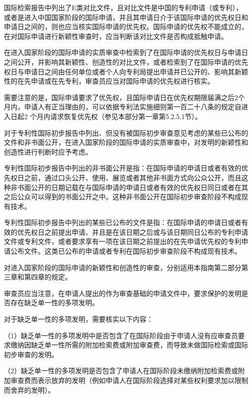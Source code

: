 国际检索报告中列出了E类对比文件，且对比文件是中国的专利申请（或专利），或者是进入中国国家阶段的国际申请，并且其申请日介于该国际申请的优先权日和申请日之间的，则也应当核实国际申请的优先权。国际申请的优先权不能成立的，在对国际申请进行新颖性审查时，应当判断该对比文件是否构成抵触申请。

在进入国家阶段的国际申请的实质审查中检索到了在国际申请的优先权日与申请日之间公开，并影响其新颖性、创造性的对比文件，或者检索到了在国际申请的优先权日与申请日之间由任何单位或者个人向专利局提出申请并已公开的、影响其新颖性的在先申请或在先专利，审查员应当对国际申请的优先权进行核实。

需要注意的是，国际申请要求了优先权，且国际申请日在优先权期限届满之后2个月内，申请人有正当理由的，可以依据专利法实施细则第一百二十八条的规定自进入日起2 个月内请求恢复优先权（参见本部分第一章第5.2.5.1节）。

对于专利性国际初步报告中列出、但没有被国际初步审查意见考虑的某些已公布的文件和非书面公开，在进入国家阶段的国际申请的实质审查中，对发明的新颖性和创造性进行判断时应予考虑。

专利性国际初步报告中列出的非书面公开是指：在国际申请的申请日或者有效的优先权日之前，通过口头公开、使用、展览或者其他非书面方式向公众公开，而且这种非书面公开的日期记载在与国际申请的申请日或者有效的优先权日同日或者在其之后公众可以得到的书面公开之中。这种非书面公开在国际初步审查阶段不构成现有技术。

专利性国际初步报告中列出的某些已公布的文件是指：在国际申请的申请日或者有效的优先权日之前提出申请、并且是在该日期之后或与该日期同日公布的专利申请文件或专利文件，或者要求享有一项在该日期之前提出的在先申请优先权的专利申请公布文件。这类已公布的申请或者专利在国际初步审查阶段不构成现有技术。

对进入国家阶段的国际申请的新颖性和创造性的审查，分别适用本指南第二部分第三章和第四章的规定。

审查员应当注意，在申请人提出的作为审查基础的申请文件中，要求保护的发明是否存在缺乏单一性的多项发明。

对于缺乏单一性的多项发明，需要核实以下内容：

{\setlength{\parindent}{17.1bp}（1）缺乏单一性的多项发明中是否包含了在国际阶段由于申请人没有应审查员要求缴纳因缺乏单一性所需的附加检索费或附加审查费，而导致未做国际检索或国际初步审查的发明。\par}

{\setlength{\parindent}{17.1bp}（2）缺乏单一性的多项发明是否包含了申请人在国际阶段未缴纳附加检索费或附加审查费而表示放弃的发明（例如申请人在国际阶段选择对某些权利要求加以限制而舍弃的发明）。\par}

